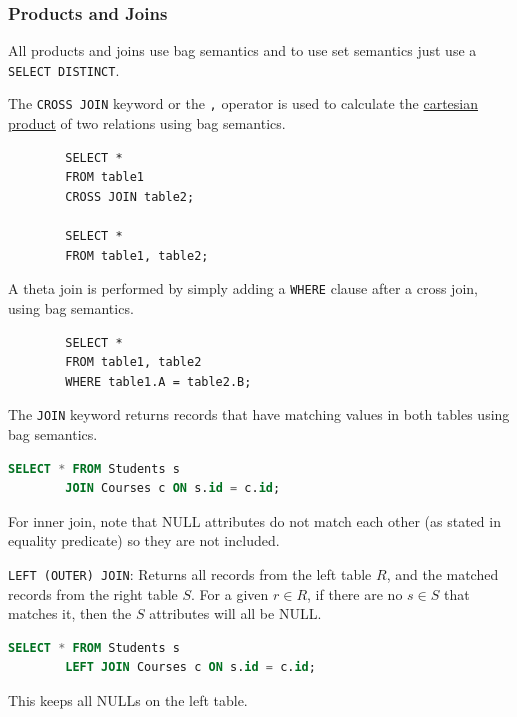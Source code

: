   \subsubsection{Products and Joins} 

    All products and joins use bag semantics and to use set semantics just use a \texttt{SELECT DISTINCT}. 

    \begin{definition}
      \label{def:cartesian-product-2}
      The \texttt{CROSS JOIN} keyword or the \texttt{,} operator is used to calculate the \hyperref[def:cartesian-product]{cartesian product} of two relations using bag semantics. 
      \begin{lstlisting}
        SELECT *
        FROM table1
        CROSS JOIN table2; 

        SELECT *
        FROM table1, table2; 
      \end{lstlisting} 
    \end{definition}

    \begin{definition}
      \label{def:theta-join-2}
      A theta join is performed by simply adding a \texttt{WHERE} clause after a cross join, using bag semantics. 
      \begin{lstlisting}
        SELECT *
        FROM table1, table2 
        WHERE table1.A = table2.B;
      \end{lstlisting}
    \end{definition} 

    \begin{definition}
      \label{def:natural-inner-join-2}
      The \texttt{JOIN} keyword returns records that have matching values in both tables using bag semantics. 
      \begin{lstlisting}[language=SQL]
        SELECT * FROM Students s
        JOIN Courses c ON s.id = c.id;
      \end{lstlisting}
      For inner join, note that NULL attributes do not match each other (as stated in equality predicate) so they are not included. 
    \end{definition}

    \begin{definition}
      \label{def:left-outer-join-2}
      \texttt{LEFT (OUTER) JOIN}: Returns all records from the left table $R$, and the matched records from the right table $S$. For a given $r \in R$, if there are no $s \in S$ that matches it, then the $S$ attributes will all be NULL. 
      \begin{lstlisting}[language=SQL]
        SELECT * FROM Students s
        LEFT JOIN Courses c ON s.id = c.id;
      \end{lstlisting} 
      This keeps all NULLs on the left table. 
    \end{definition}

